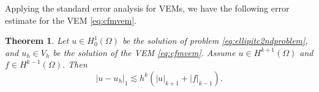 \documentclass[10pt]{amsart}
\newtheorem{theorem}{Theorem}[section]
\renewcommand{\div}{\operatorname{div}}
\numberwithin{equation}{section}
\begin{document}
Applying the standard error analysis for VEMs, we have the following error estimate for the VEM \eqref{eq:cfmvem}.
\begin{theorem}\label{thm:cfmerrorestimateH1}
Let $u\in H_0^1(\Omega)$ be the solution of problem \eqref{eq:ellipitc2ndproblem}, and $u_h\in V_h$ be the solution of the VEM \eqref{eq:cfmvem}. Assume $u\in H^{k+1}(\Omega)$ and $f\in H^{k-1}(\Omega)$. Then
\begin{equation*}%
|u-u_h|_1\lesssim h^k(|u|_{k+1}+|f|_{k-1}).
\end{equation*}
\end{theorem}
\end{document}
